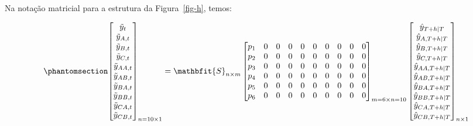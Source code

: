 \documentclass[
  12pt,
  twoside,
  openright,
  a4paper,
  chapter=TITLE,
  section=TITLE,
  brazil]{abntex2}
\begin{document}
Na notação matricial para a estrutura da Figura~\ref{fig-h}, temos:

\begin{equation}\phantomsection\label{eq-matriz_topdown1}{
\begin{bmatrix}
    \tilde{y}_{t} \\
    \tilde{y}_{A, t} \\
    \tilde{y}_{B, t} \\
    \tilde{y}_{C, t} \\
    \tilde{y}_{AA, t} \\
    \tilde{y}_{AB, t} \\
    \tilde{y}_{BA, t} \\
    \tilde{y}_{BB, t} \\
    \tilde{y}_{CA, t} \\
    \tilde{y}_{CB, t}
\end{bmatrix}_{n=10 \times 1}
=
\mathbfit{S}_{n \times m}
\begin{bmatrix}
    p_1 & 0 & 0 & 0 & 0 & 0 & 0 & 0 & 0 & 0 \\
    p_2 & 0 & 0 & 0 & 0 & 0 & 0 & 0 & 0 & 0 \\
    p_3 & 0 & 0 & 0 & 0 & 0 & 0 & 0 & 0 & 0 \\
    p_4 & 0 & 0 & 0 & 0 & 0 & 0 & 0 & 0 & 0 \\
    p_5 & 0 & 0 & 0 & 0 & 0 & 0 & 0 & 0 & 0 \\
    p_6 & 0 & 0 & 0 & 0 & 0 & 0 & 0 & 0 & 0
\end{bmatrix}_{m=6 \times n=10}
\begin{bmatrix}
    \hat{y}_{T+h|T} \\
    \hat{y}_{A, T+h|T} \\
    \hat{y}_{B, T+h|T} \\
    \hat{y}_{C, T+h|T} \\
    \hat{y}_{AA, T+h|T} \\
    \hat{y}_{AB, T+h|T} \\
    \hat{y}_{BA, T+h|T} \\
    \hat{y}_{BB, T+h|T} \\
    \hat{y}_{CA, T+h|T} \\
    \hat{y}_{CB, T+h|T}
\end{bmatrix}_{n \times 1}
}\end{equation}
\end{document}
